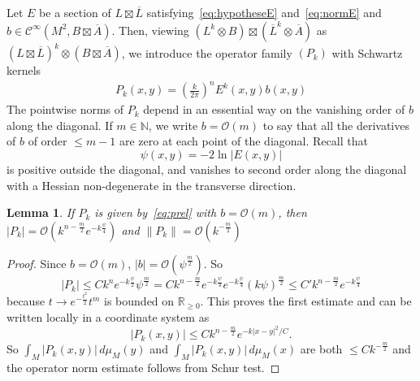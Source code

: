 \documentclass[10pt,a4paper]{article}
\newtheorem{lemm}[theo]{Lemma}
\theoremstyle{definition}
\numberwithin{equation}{section}
\newcommand{\R}{{\mathbb{R}}}
\newcommand{\N}{{\mathbb{N}}}
\newcommand{\con}{\overline}
\newcommand{\Ci}{{\mathcal{C}}^{\infty}}
\newcommand{\bigo}{\mathcal{O}}
\begin{document}
Let $E$ be a section of $L \boxtimes \con L $ satisfying~\eqref{eq:hypotheseE} and~\eqref{eq:normE} and $b \in \Ci (M^2, B \boxtimes \con A)$. Then, viewing $(L^k \otimes B) \boxtimes (\con{L}^k \otimes \con{A})$ as $(L \boxtimes \con L)^k \otimes (B \boxtimes
\con{A})$, we introduce the operator family $(P_k)$ with Schwartz kernels
\begin{gather}\label{eq:prel}
P_k (x,y) = \left(\frac{k}{2\pi} \right)^n E^k(x,y) b (x,y)
\end{gather}
The pointwise norms of $P_k$ depend in an essential way on the vanishing order of $b$ along the diagonal. If $m \in \N$, we write $b = \bigo (m)$ to say that all the derivatives of $b$ of order $\leqslant m-1$ are zero at each point of the diagonal. Recall that
\[
\psi (x,y) = - 2 \ln |E(x,y)|
\]
is positive outside the
diagonal, and vanishes to second order along the diagonal with a Hessian non-degenerate in the transverse direction.

\begin{lemm}\label{lem:estimate}
If $P_k$ is given by~\eqref{eq:prel} with $b = \bigo (m)$, then  $|P_k | = \bigo (k^{n-\frac{m}{2}} e^{-k
\frac{\psi}{4}})$  and $\| P_k \| = \bigo (k^{- \frac{m}{2}})$
\end{lemm}

\begin{proof}
Since $b = \bigo (m)$, $ | b | = \bigo (\psi ^{\frac{m}{2}}
)$. So 
\[
|P_k | \leqslant C k^n e^{-k \frac{\psi}{2}} \psi ^{\frac{m}{2}}
= C k^{n- \frac{m}{2}} e^{-k \frac{\psi}{4}} e^{-k \frac{\psi}{4}} (k\psi) ^{\frac{m}{2}}
\leqslant C' k^{n- \frac{m}{2}} e^{-k \frac{\psi}{4}}
\]
because $t \rightarrow e^{-\frac{t^2}{2} } t^m$ is bounded on $\R_{\geqslant 0}$. This proves the first estimate and can be written locally in a coordinate system as
\[
|P_k (x,y) | \leqslant C k^{n - \frac{m}{2}} e^{-k|x-y|^2 /C}.
\]
So $\int_M |P_k(x,y)| \, d\mu_M (y)$ and $\int_M |P_k (x,y)|\, d\mu_M (x)$ are both $\leqslant C k^{-\frac{m}{2}}$ and the operator norm estimate follows from Schur test.
\end{proof}
\end{document}
